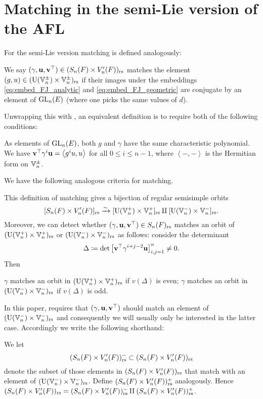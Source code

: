 \section{Matching in the semi-Lie version of the AFL}
For the semi-Lie version matching is defined analogously:
\begin{definition}
  We say $(\gamma, \mathbf u, \mathbf v^\top) \in (S_n(F) \times V'_n(F))_{\mathrm{rs}}$
  matches the element $(g, u) \in (\operatorname{U}(\mathbb V_n^\pm) \times \mathbb V_n^\pm)_{\mathrm{rs}}$ if
  their images under the embeddings \eqref{eq:embed_FJ_analytic}
  and \eqref{eq:embed_FJ_geometric} are conjugate by an element of $\operatorname{GL}_n(E)$
  (where one picks the same values of $d$).

  Unwrapping this with ,
  an equivalent definition is to require both of the following conditions:
  \begin{itemize}
    \ii As elements of $\operatorname{GL}_n(E)$,
    both $g$ and $\gamma$ have the same characteristic polynomial.
    \ii We have $\mathbf v^\top \gamma^i \mathbf u = \left< g^i u, u \right>$ for all $0 \le i \le n-1$,
    where $\left< -,- \right>$ is the Hermitian form on $\mathbb V_n^\pm$.
  \end{itemize}
  \label{def:matching_semi_lie}
\end{definition}
We have the following analogous criteria for matching.
\begin{proposition}
  \label{prop:valuation_delta_matching_semilie}
  This definition of matching gives a bijection of regular semisimple orbits
  \[ [S_n(F) \times V'_n(F)]_{\mathrm{rs}} \xrightarrow{\sim} [\operatorname{U}(\mathbb V_n^+) \times \mathbb V_n^+]_{\mathrm{rs}} \amalg [\operatorname{U}(\mathbb V_n^-) \times \mathbb V_n^-]_{\mathrm{rs}}. \]
  Moreover, we can detect whether ${(\gamma, \mathbf u, \mathbf v^\top)} \in S_n(F)_{\mathrm{rs}}$ matches an orbit of
  $(\operatorname{U}(\mathbb V_n^+) \times \mathbb V_n^+)_{\mathrm{rs}}$ or $(\operatorname{U}(\mathbb V_n^-) \times \mathbb V_n^-)_{\mathrm{rs}}$ as follows:
  consider the determinant
  \[ \Delta \coloneqq \det \left[ \mathbf v^\top \gamma^{i+j-2} \mathbf u \right]_{i,j=1}^n \neq 0. \]
  Then
  \begin{itemize}
    \ii $\gamma$ matches an orbit in $(\operatorname{U}(\mathbb V_n^+) \times \mathbb V_n^+)_{\mathrm{rs}}$ if $v(\Delta)$ is even;
    \ii $\gamma$ matches an orbit in $(\operatorname{U}(\mathbb V_n^-) \times \mathbb V_n^-)_{\mathrm{rs}}$ if $v(\Delta)$ is odd.
  \end{itemize}
\end{proposition}
In this paper, 
requires that ${(\gamma, \mathbf u, \mathbf v^\top)}$ should match an element of $(\operatorname{U}(\mathbb V_n^-) \times \mathbb V_n^-)_{\mathrm{rs}}$
and consequently we will usually only be interested in the latter case.
Accordingly we write the following shorthand:
\begin{definition}
  [$(S_n(F) \times V'_n(F))\rs^\pm$]
  We let \[ (S_n(F) \times V'_n(F))_{\mathrm{rs}}^- \subset (S_n(F) \times V'_n(F))_{\mathrm{rs}}  \]
  denote the subset of those elements in $(S_n(F) \times V'_n(F))_{\mathrm{rs}}$ that match
  with an element of $(\operatorname{U}(\mathbb V_n^-) \times \mathbb V_n^-)_{\mathrm{rs}}$.
  Define $(S_n(F) \times V'_n(F))_{\mathrm{rs}}^+$ analogously.
  Hence $(S_n(F) \times V'_n(F))_{\mathrm{rs}} = (S_n(F) \times V'_n(F))_{\mathrm{rs}}^- \amalg (S_n(F) \times V'_n(F))_{\mathrm{rs}}^+$.
\end{definition}
